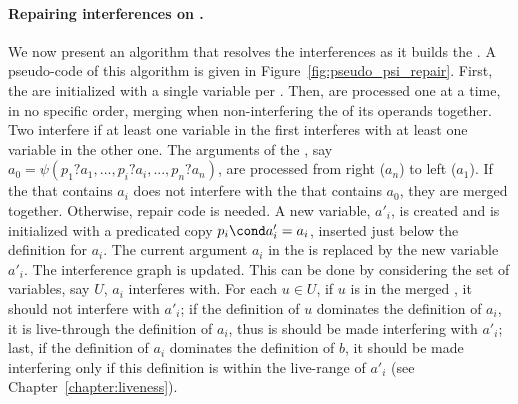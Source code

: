 \paragraph{Repairing interferences on \psifuns.}
We now present an algorithm that resolves the interferences as it builds the \psiwebs. A
pseudo-code of this algorithm is given in
Figure~\ref{fig:pseudo_psi_repair}.
First, the \psiwebs are initialized with a single variable per \psiweb. Then,
\psifuns are processed one at a time, in no specific order, merging when non-interfering the \psiwebs of its operands together.
Two \psiwebs interfere if at least one variable in
the first \psiweb interferes with at least one variable in the
other one.
The arguments of the \psifun, say ${a_0 = \psi(p_1?a_1, ..., p_i?a_i, ...,
  p_n?a_n)}$, are processed
from right ($a_n$) to left ($a_1$). If the \psiweb that contains $a_i$ does not interfere with the \psiweb that contains $a_0$, they are merged together.
Otherwise, repair code is
needed. A new variable, ${a'_i}$, is created and is initialized
with a predicated copy ${p_i\cond a'_i = a_i}$, inserted just below
the definition for ${a_i}$. The current argument ${a_i}$ in
the \psifun is replaced by the new variable ${a'_i}$. The
interference graph is updated. This can be done by considering the set of variables, say $U$, $a_i$ interferes with. For each $u\in U$, if $u$ is in the merged \psiweb, it should not interfere with $a'_i$; if the definition of $u$ dominates the definition of $a_i$, it is live-through the definition of $a_i$, thus is should be made interfering with $a'_i$; last, if the definition of $a_i$ dominates the definition of $b$, it should be made interfering only if this definition is within the live-range of $a'_i$ (see Chapter~\ref{chapter:liveness}). 

